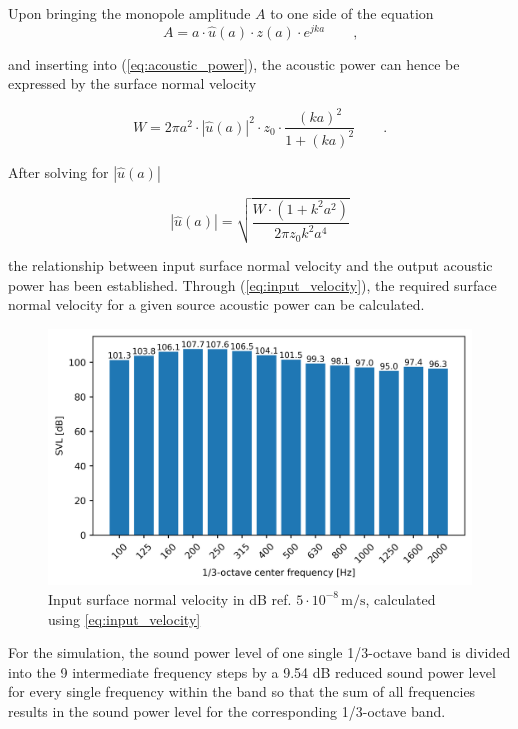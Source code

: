 Upon bringing the monopole amplitude $A$ to one side of the equation
\begin{equation}
	A = a\cdot\hat{u}(a)\cdot z(a)\cdot e^{jka}\qquad\text{,}
\end{equation}

and inserting into (\ref{eq:acoustic_power}), the acoustic power can hence be expressed by the surface normal velocity

\begin{equation}
	W = 2\pi a^2\cdot|\hat{u}(a)|^2\cdot z_0 \cdot \frac{(ka)^2}{1+(ka)^2} \qquad\text{.}
\end{equation}

After solving for $|\hat{u}(a)|$

\begin{equation}
	|\hat{u}(a)| = \sqrt{\frac{W\cdot(1 + k^2a^2)}{2\pi z_0 k^2a^4}} \label{eq:input_velocity}
\end{equation}

the relationship between input surface normal velocity and the output acoustic power has been established. Through (\ref{eq:input_velocity}), the required surface normal velocity for a given source acoustic power can be calculated.

\begin{figure}[H]
	\centering
	\includegraphics{fig/chap4/input_SVL.png}
	\caption{Input surface normal velocity in dB ref. $5\cdot10^{-8}\,\text{m/s}$, calculated using \ref{eq:input_velocity}}
\end{figure}

For the simulation, the sound power level of one single 1/3-octave band is divided into the 9 intermediate frequency steps by a 9.54 dB reduced sound power level for every single frequency within the band so that the sum of all frequencies results in the sound power level for the corresponding 1/3-octave band.




